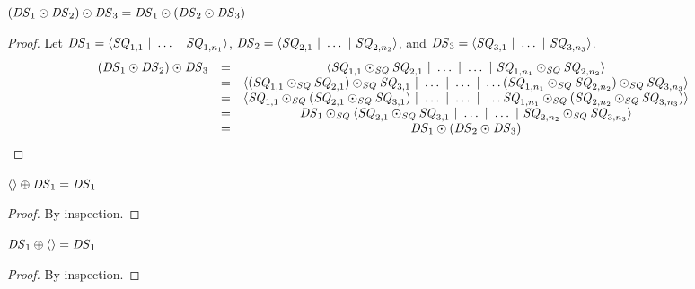 \documentclass[acmsmall]{acmart}
\begin{document}
\begin{lemma}
  \label{lem:dnf-concat-assoc}
  $(\mathit{DS}_1 \odot \mathit{DS}_2) \odot \mathit{DS}_3 =
  \mathit{DS}_1 \odot (\mathit{DS}_2 \odot \mathit{DS}_3)$
\end{lemma}
\begin{proof}
  Let $\mathit{DS}_1 = \langle\mathit{SQ}_{1,1} ~|~ \ldots ~|~ \mathit{SQ}_{1,n_1}\rangle$,
  $\mathit{DS}_2 = \langle\mathit{SQ}_{2,1} ~|~ \ldots ~|~ \mathit{SQ}_{2,n_2}\rangle$, and
  $\mathit{DS}_3 = \langle\mathit{SQ}_{3,1} ~|~ \ldots ~|~ \mathit{SQ}_{3,n_3}\rangle$.
  \[
    \begin{array}{ccc}
      (\mathit{DS}_1 \odot \mathit{DS}_2) \odot \mathit{DS}_3
      & = & \langle\mathit{SQ}_{1,1}\odot_{\mathit{SQ}}\mathit{SQ}_{2,1} ~|~ 
            \ldots ~|~ \ldots ~|~ \mathit{SQ}_{1,n_1}\odot_{\mathit{SQ}}\mathit{SQ}_{2,n_2}\rangle\\
      & = &
            \langle(\mathit{SQ}_{1,1}\odot_{\mathit{SQ}}\mathit{SQ}_{2,1})\odot_{\mathit{SQ}}\mathit{SQ}_{3,1} ~|~ 
            \ldots ~|~ \ldots ~|~ \ldots
            (\mathit{SQ}_{1,n_1}\odot_{\mathit{SQ}}\mathit{SQ}_{2,n_2})\odot_{\mathit{SQ}}\mathit{SQ}_{3,n_3}\rangle\\
      & = &
            \langle\mathit{SQ}_{1,1}\odot_{\mathit{SQ}}(\mathit{SQ}_{2,1}\odot_{\mathit{SQ}}\mathit{SQ}_{3,1}) ~|~ 
            \ldots ~|~ \ldots ~|~ \ldots
            \mathit{SQ}_{1,n_1}\odot_{\mathit{SQ}}(\mathit{SQ}_{2,n_2}\odot_{\mathit{SQ}}\mathit{SQ}_{3,n_3})\rangle\\
      & = &
            \mathit{DS}_1 \odot_{\mathit{SQ}}
            \langle\mathit{SQ}_{2,1}\odot_{\mathit{SQ}}\mathit{SQ}_{3,1} ~|~ 
            \ldots ~|~ \ldots ~|~ \mathit{SQ}_{2,n_2}\odot_{\mathit{SQ}}\mathit{SQ}_{3,n_3}\rangle\\
      & = &
            \mathit{DS}_1 \odot (\mathit{DS}_2 \odot \mathit{DS}_3)
    \end{array}
  \]
\end{proof}

\begin{lemma}
  \label{lem:dnf-or-identity-left}
  $\langle\rangle \oplus \mathit{DS}_1 = \mathit{DS}_1$
\end{lemma}
\begin{proof}
  By inspection.
\end{proof}

\begin{lemma}
  \label{lem:dnf-or-identity-right}
  $\mathit{DS}_1 \oplus \langle\rangle = \mathit{DS}_1$
\end{lemma}
\begin{proof}
  By inspection.
\end{proof}
\end{document}
